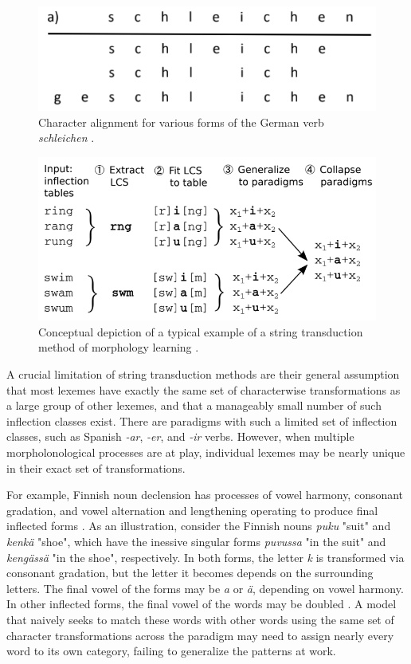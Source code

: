 \begin{figure}[ht]
\includegraphics[width=12cm]{images/Nicolai2015_schleichen.png}
\centering
\caption{Character alignment for various forms of the German verb \textit{schleichen} \parencite{Nicolai2015}.}
\end{figure}

\begin{figure}[ht]
\includegraphics[width=12cm]{images/Hulden2014_diagram.png}
\centering
\caption{Conceptual depiction of a typical example of a string transduction method of morphology learning \parencite{Hulden2014}.}
\end{figure}

A crucial limitation of string transduction methods are their general assumption that most lexemes have exactly the same set of characterwise transformations as a large group of other lexemes, and that a manageably small number of such inflection classes exist. There are paradigms with such a limited set of inflection classes, such as Spanish \textit{-ar}, \textit{-er}, and \textit{-ir} verbs. However, when multiple morpholonological processes are at play, individual lexemes may be nearly unique in their exact set of transformations.

For example, Finnish noun declension has processes of vowel harmony, consonant gradation, and vowel alternation and lengthening operating to produce final inflected forms \parencite{Ranta2008}. As an illustration, consider the Finnish nouns \textit{puku} "suit" and \textit{kenkä} "shoe", which have the inessive singular forms \textit{puvussa} "in the suit" and \textit{kengässä} "in the shoe", respectively. In both forms, the letter \textit{k} is transformed via consonant gradation, but the letter it becomes depends on the surrounding letters. The final vowel of the forms may be \textit{a} or \textit{ä}, depending on vowel harmony. In other inflected forms, the final vowel of the words may be doubled \parencite{Wiktionary}. A model that naively seeks to match these words with other words using the same set of character transformations across the paradigm may need to assign nearly every word to its own category, failing to generalize the patterns at work.

